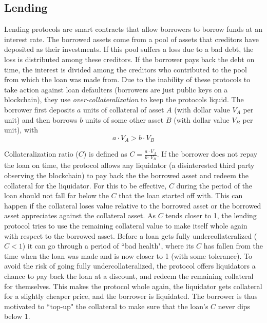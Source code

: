 \documentclass[conference]{IEEEtran}
\begin{document}
\subsection{Lending}
Lending protocols are smart contracts that allow borrowers to borrow funds at an interest rate. The borrowed assets come from a pool of assets that creditors have deposited as their investments. If this pool suffers a loss due to a bad debt, the loss is distributed among these creditors. If the borrower pays back the debt on time, the interest is divided among the creditors who contributed to the pool from which the loan was made from. Due to the inability of these protocols to take action against loan defaulters (borrowers are just public keys on a blockchain), they use \textit{over-collateralization} to keep the protocols liquid. The borrower first deposits $a$ units of collateral of asset $A$ (with dollar value $V_A$ per unit) and then borrows $b$ units of some other asset $B$ (with dollar value $V_B$ per unit), with $$a\cdot V_A > b\cdot V_B$$ 

Collateralization ratio ($C$) is defined as $C = \frac{a\cdot V_A}{b\cdot V_B}$. If the borrower does not repay the loan on time, the protocol allows any liquidator (a disinterested third party observing the blockchain) to pay back the the borrowed asset and redeem the collateral for the liquidator. For this to be effective, $C$ during the period of the loan should not fall far below the $C$ that the loan started off with. This can happen if the collateral loses value relative to the borrowed asset or the borrowed asset appreciates against the collateral asset. As $C$ tends closer to 1, the lending protocol tries to use the remaining collateral value to make itself whole again with respect to the borrowed asset. Before a loan gets fully undercollateralized ($C < 1$) it can go through a period of ``bad health", where its $C$ has fallen from the time when the loan was made and is now closer to 1 (with some tolerance). To avoid the risk of going fully undercollateralized, the protocol offers liquidators a chance to pay back the loan at a discount, and redeem the remaining collateral for themselves. This makes the protocol whole again, the liquidator gets collateral for a slightly cheaper price, and the borrower is liquidated. The borrower is thus motivated to ``top-up" the collateral to make sure that the loan's $C$ never dips below 1.
\end{document}
